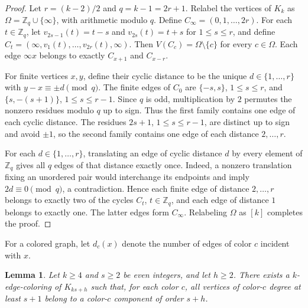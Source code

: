 \documentclass[11pt]{article}
\newtheorem{lemma}[theorem]{Lemma}
\theoremstyle{definition}
\theoremstyle{remark}
\begin{document}
\begin{proof}
Let \(r=(k-2)/2\) and \(q=k-1=2r+1\). Relabel the vertices of
\(K_k\) as \(\Omega=\mathbb Z_q\cup\{\infty\}\), with arithmetic
modulo \(q\). Define \(C_\infty=(0,1,\ldots,2r)\). For each
\(t\in\mathbb Z_q\), let \(v_{2s-1}(t)=t-s\) and
\(v_{2s}(t)=t+s\) for \(1\le s\le r\), and define
\(C_t=(\infty,v_1(t),\ldots,v_{2r}(t),\infty)\). Then
\(V(C_c)=\Omega\setminus\{c\}\) for every \(c\in\Omega\).
Each edge \(\infty x\) belongs to exactly \(C_{x+1}\) and
\(C_{x-r}\).

For finite vertices \(x,y\), define their cyclic distance to be the
unique \(d\in\{1,\ldots,r\}\) with \(y-x\equiv\pm d\pmod q\).
The finite edges of \(C_0\) are \(\{-s,s\}\), \(1\le s\le r\),
and \(\{s,-(s+1)\}\), \(1\le s\le r-1\). Since \(q\) is odd,
multiplication by \(2\) permutes the nonzero residues modulo \(q\)
up to sign. Thus the first family contains one edge of each cyclic
distance. The residues \(2s+1\), \(1\le s\le r-1\), are distinct
up to sign and avoid \(\pm1\), so the second family contains one
edge of each distance \(2,\ldots,r\).

For each \(d\in\{1,\ldots,r\}\), translating an edge of cyclic
distance \(d\) by every element of \(\mathbb Z_q\) gives all \(q\)
edges of that distance exactly once. Indeed, a nonzero translation
fixing an unordered pair would interchange its endpoints and imply
\(2d\equiv0\pmod q\), a contradiction. Hence each finite edge of
distance \(2,\ldots,r\) belongs to exactly two of the cycles
\(C_t\), \(t\in\mathbb Z_q\), and each edge of distance \(1\)
belongs to exactly one. The latter edges form \(C_\infty\).
Relabeling \(\Omega\) as \([k]\) completes the proof.
\end{proof}

For a colored graph, let \(d_c(x)\) denote
the number of edges of color \(c\) incident with \(x\).

\begin{lemma}\label{lem:even-coloring}
Let \(k\ge4\) and \(s\ge2\) be even integers, and let \(h\ge2\).
There exists a \(k\)-edge-coloring of \(K_{ks+h}\) such that, for
each color \(c\), all vertices of color-\(c\) degree at least
\(s+1\) belong to a color-\(c\) component of order \(s+h\).
\end{lemma}
\end{document}
